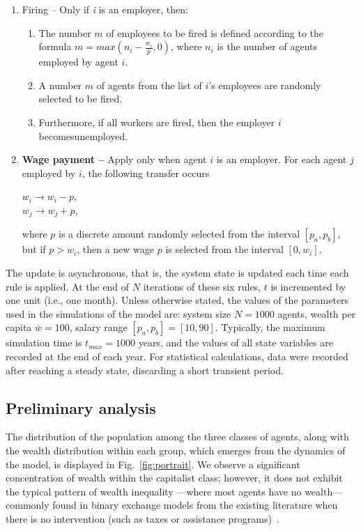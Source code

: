 \begin{enumerate}
\item { Firing --} Only if \textit{i} is an employer, then:
 
\begin{enumerate}[leftmargin=*]
    \item The number $m$ of employees to be fired is defined according to the  formula 
$ m=max(n_{i}-\frac{w_{i}}{\overline{p}},0)$, 
where $n_i$ is the number of agents employed by agent $i$. 
 
    
\item A number $m$ of agents from the list of $i$'s employees are randomly selected to be fired.

\item
Furthermore, if all workers are fired, then the employer $i$ becomesunemployed.


\end{enumerate}
\item 
{\bf Wage payment --} Apply only when agent $i$ is an employer. 
For each agent $j$ employed by $i$, the following transfer occurs  
\begin{center}  
  $w_i  \to w_i-p$,  \\
  $w_j  \to w_j+p$,
\end{center}
where $p$ is a discrete amount randomly selected from the interval $[p_a,p_b]$, but if $p > w_i$, then a new wage $p$ is selected from the interval $[0,w_i]$.
  


\end{enumerate}

The update is asynchronous, that is, the system state is updated each time each rule is applied. 
At the end of $N$ iterations of these six rules, $t$ is incremented by one unit (i.e., one month). 
%
Unless otherwise stated, the values of the parameters used in the simulations of the model are: system size $N = 1000$ agents, wealth per capita $\overline{w} = 100$, salary range $[p_a,p_b]=[10,90]$. Typically, the maximum simulation time is $t_{max}=1000$ years, and the values of all state variables are recorded at the end of each year. 
For statistical calculations, data were recorded after reaching a steady state, discarding a short transient period. 



\subsection{Preliminary  analysis}
%

%
The distribution of the population among the three classes of agents, along with the wealth distribution within each group, which emerges from the dynamics of the model, is displayed in Fig.~\ref{fig:portrait}. 
We observe a significant concentration of wealth within the capitalist class; however, it does not exhibit the typical pattern of wealth inequality ---where most agents have no wealth--- commonly found in binary exchange models from the existing literature when there is no intervention (such as taxes or assistance programs)~\cite{moukarzel2007,boghosian2014,CARDOSO2020,LIMA2022}.

